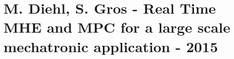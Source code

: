 \section{M. Diehl, S. Gros - Real Time MHE and MPC for a large scale mechatronic application - 2015}